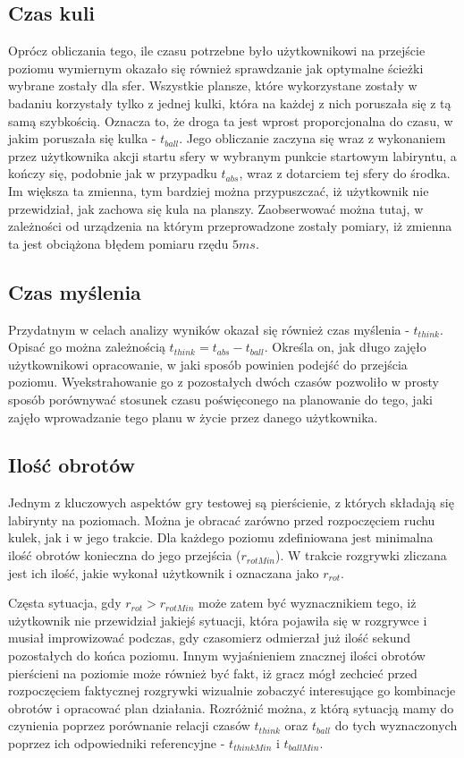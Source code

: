 \documentclass[a4paper,12pt,numbers=noenddot]{report}
\begin{document}
	\subsection{Czas kuli}
Oprócz obliczania tego, ile czasu potrzebne było użytkownikowi na przejście poziomu wymiernym okazało się również sprawdzanie jak optymalne ścieżki wybrane zostały dla sfer. Wszystkie plansze, które wykorzystane zostały w badaniu korzystały tylko z jednej kulki, która na każdej z nich poruszała się z tą samą szybkością. Oznacza to, że droga ta jest wprost proporcjonalna do czasu, w jakim poruszała się kulka - $t_{ball}$. Jego obliczanie zaczyna się wraz z wykonaniem przez użytkownika akcji startu sfery w wybranym punkcie startowym labiryntu, a kończy się, podobnie jak w przypadku $t_{abs}$, wraz z dotarciem tej sfery do środka. Im większa ta zmienna, tym bardziej można przypuszczać, iż użytkownik nie przewidział, jak zachowa się kula na planszy. Zaobserwować można tutaj, w zależności od urządzenia na którym przeprowadzone zostały pomiary, iż zmienna ta jest obciążona błędem pomiaru rzędu $5 ms$.
	\subsection{Czas myślenia}
Przydatnym w celach analizy wyników okazał się również czas myślenia - $t_{think}$. Opisać go można zależnością $t_{think} = t_{abs} - t_{ball}$. Określa on, jak długo zajęło użytkownikowi opracowanie, w jaki sposób powinien podejść do przejścia poziomu. Wyekstrahowanie go z pozostałych dwóch czasów pozwoliło w prosty sposób porównywać stosunek czasu poświęconego na planowanie do tego, jaki zajęło wprowadzanie tego planu w życie przez danego użytkownika.
	\subsection{Ilość obrotów}
Jednym z kluczowych aspektów gry testowej są pierścienie, z których składają się labirynty na poziomach. Można je obracać zarówno przed rozpoczęciem ruchu kulek, jak i w jego trakcie. Dla każdego poziomu zdefiniowana jest minimalna ilość obrotów konieczna do jego przejścia ($r_{rotMin}$). W trakcie rozgrywki zliczana jest ich ilość, jakie wykonał użytkownik i oznaczana jako $r_{rot}$. 

Częsta sytuacja, gdy $r_{rot} > r_{rotMin}$  może zatem być wyznacznikiem tego, iż użytkownik nie przewidział jakiejś sytuacji, która pojawiła się w rozgrywce i musiał improwizować podczas, gdy czasomierz odmierzał już ilość sekund pozostałych do końca poziomu. Innym wyjaśnieniem znacznej ilości obrotów pierścieni na poziomie może również być fakt, iż gracz mógł zechcieć przed rozpoczęciem faktycznej rozgrywki wizualnie zobaczyć interesujące go kombinacje obrotów i opracować plan działania. Rozróżnić można, z którą sytuacją mamy do czynienia poprzez porównanie relacji czasów $t_{think}$ oraz $t_{ball}$ do tych wyznaczonych poprzez ich odpowiedniki referencyjne - $t_{thinkMin}$ i $t_{ballMin}$.
\end{document}
